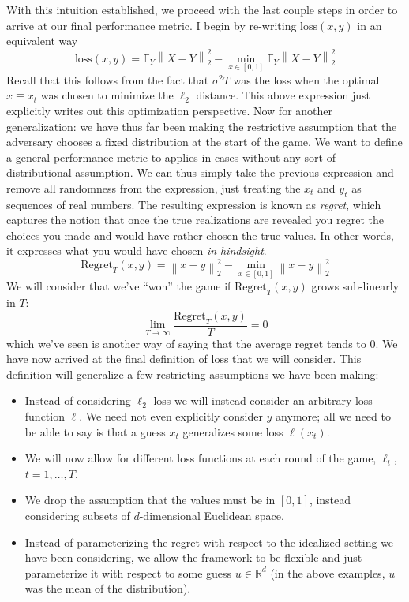 \documentclass[12pt]{article}
\newcommand*{\norm}[1]{\left\lVert#1\right\rVert}
\newcommand{\E}{\mathbb{E}}
\newcommand{\R}{\mathcal{R}}
\def\R{\mathbb{R}}
\begin{document}
With this intuition established, we proceed with the last couple steps in order to arrive at our final performance metric. I begin by re-writing $\text{loss}(x, y)$ in an equivalent way
\[\text{loss}(x, y) = \E_Y \norm{X - Y}_2^2 - \min_{x \in [0, 1]} \E_Y \norm{X - Y}_2^2 \]
Recall that this follows from the fact that $\sigma^2 T$ was the loss when the optimal $x \equiv x_t$ was chosen to minimize the $\ell_2$ distance. This above expression just explicitly 
writes out this optimization perspective. Now for another generalization: we have thus far been making the restrictive assumption that the adversary chooses a fixed distribution at the start of the game. We want to 
define a general performance metric to applies in cases without any sort of distributional assumption. We can thus simply take the previous expression and remove all randomness from the expression, 
just treating the $x_t$ and $y_t$ as sequences of real numbers. The resulting expression is known as \textit{regret}, which captures the notion that once the true realizations are revealed you regret 
the choices you made  and would have rather chosen the true values. In other words, it expresses what you would have chosen \textit{in hindsight}. 
\[\text{Regret}_T(x, y) = \norm{x - y}_2^2 - \min_{x \in [0, 1]} \norm{x - y}_2^2 \]
We will consider that we've ``won'' the game if $\text{Regret}_T(x, y)$ grows sub-linearly in $T$: 
\[\lim_{T \to \infty} \frac{\text{Regret}_T(x, y)}{T} = 0\]
which we've seen is another way of saying that the average regret tends to $0$. We have now arrived at the final definition of loss that we will consider. This definition will generalize a few restricting assumptions
we have been making: 
\begin{itemize}
\item Instead of considering $\ell_2$ loss we will instead consider an arbitrary loss function $\ell$. We need not even explicitly consider $y$ anymore; all we need to be able to say is that 
a guess $x_t$ generalizes some loss $\ell(x_t)$. 
\item We will now allow for different loss functions at each round of the game, $\ell_t$, $t = 1, \dots, T$. 
\item We drop the assumption that the values must be in $[0, 1]$, instead considering subsets of $d$-dimensional Euclidean space.  
\item Instead of parameterizing the regret with respect to the idealized setting we have been considering, we allow the framework to be flexible and just parameterize it with respect to 
some guess $u \in \R^d$ (in the above examples, $u$ was the mean of the distribution). 
\end{itemize}
\end{document}
